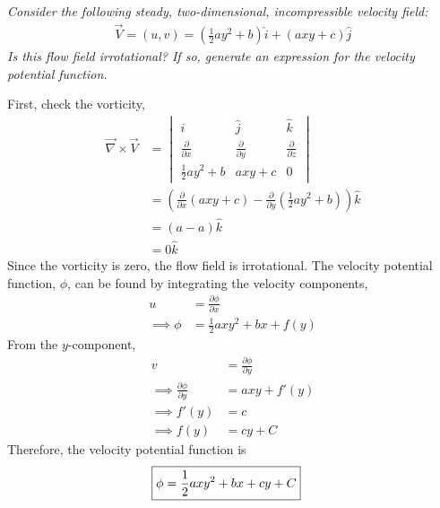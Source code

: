 \section{}

\textit{Consider the following steady, two-dimensional, incompressible velocity field:}
\begin{align*}
    \vec{V} = (u, v) = \left(\frac{1}{2}ay^2 + b\right)\hat{i} + (axy + c)\hat{j}
\end{align*}
\textit{Is this flow field irrotational? If so, generate an expression for the velocity potential function.}

First, check the vorticity,
\begin{align*}
    \vec{\nabla} \times \vec{V} &= \begin{vmatrix}
        \hat{i} & \hat{j} & \hat{k} \\
        \frac{\partial}{\partial x} & \frac{\partial}{\partial y} & \frac{\partial}{\partial z} \\
        \frac{1}{2}ay^2 + b & axy + c & 0
    \end{vmatrix} \\[1em]
    &= \left(\frac{\partial}{\partial x}(axy + c) - \frac{\partial}{\partial y}(\frac{1}{2}ay^2 + b)\right)\hat{k} \\
    &= (a - a)\hat{k} \\
    &= 0\hat{k}
\end{align*}
Since the vorticity is zero, the flow field is irrotational. The velocity potential function, $\phi$, can be found by integrating the velocity components,
\begin{align*}
    u &= \frac{\partial \phi}{\partial x} \\
    \implies \phi &= \frac{1}{2}axy^2 + bx + f(y)
\end{align*}
From the $y$-component,
\begin{align*}
    v &= \frac{\partial \phi}{\partial y} \\
    \implies \frac{\partial \phi}{\partial y} &= axy + f'(y) \\
    \implies f'(y) &= c \\
    \implies f(y) &= cy + C
\end{align*}
Therefore, the velocity potential function is
\begin{align*}
    \Aboxed{\phi &= \frac{1}{2}axy^2 + bx + cy + C}
\end{align*}
